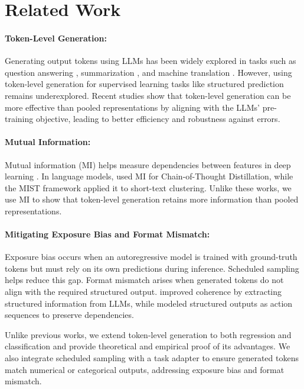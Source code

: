 \section{Related Work}
\paragraph{Token-Level Generation:}  
Generating output tokens using LLMs has been widely explored in tasks such as question answering \cite{rajpurkar2016squad, yang2019xlnet}, summarization \cite{lewis2019bart, zhang2020pegasus}, and machine translation \cite{vaswani2017attention, wu2016google}. However, using token-level generation for supervised learning tasks like structured prediction remains underexplored. Recent studies \cite{chen2023token, yu2024breaking} show that token-level generation can be more effective than pooled representations by aligning with the LLMs' pre-training objective, leading to better efficiency and robustness against errors.

\paragraph{Mutual Information:}  
Mutual information (MI) helps measure dependencies between features in deep learning \cite{cover1999elements, covert2023learning}. In language models, \citet{chen2024learning} used MI for Chain-of-Thought Distillation, while the MIST framework \cite{kamthawee2024mist} applied it to short-text clustering. Unlike these works, we use MI to show that token-level generation retains more information than pooled representations.

\paragraph{Mitigating Exposure Bias and Format Mismatch:}  
Exposure bias occurs when an autoregressive model is trained with ground-truth tokens but must rely on its own predictions during inference. Scheduled sampling \cite{bengio2015scheduled} helps reduce this gap. Format mismatch arises when generated tokens do not align with the required structured output. \citet{wang2022code4struct} improved coherence by extracting structured information from LLMs, while \citet{liu2022autoregressive} modeled structured outputs as action sequences to preserve dependencies.


Unlike previous works, we extend token-level generation to both regression and classification and provide theoretical and empirical proof of its advantages. We also integrate scheduled sampling with a task adapter to ensure generated tokens match numerical or categorical outputs, addressing exposure bias and format mismatch.